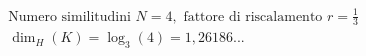 \documentclass[preview]{standalone}
\begin{document}
\begin{align*}
&\text{Numero similitudini } N = 4, \text{ fattore di riscalamento } r = \frac{1}{3} \\ &\dim_H(K) = \log_{3}(4) = 1,26186...
\end{align*}
\end{document}

